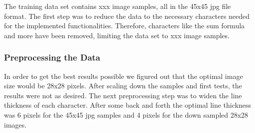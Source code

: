 \documentclass[@CLASSOPTIONS@]{tumarticle}
\begin{document}
The training data set contains xxx image samples, all in the 45x45 jpg file format.
The first step was to reduce the data to the necessary characters needed for the
implemented functionalities.
Therefore, characters like the sum formula and more have been removed, limiting the data set
to xxx image samples.

\subsubsection{Preprocessing the Data}

In order to get the best results possible we figured out that the optimal image size would be
28x28 pixels.
After scaling down the samples and first tests, the results were not as desired.
The next preprocessing step was to widen the line thickness of each character.
After some back and forth the optimal line thickness was 6 pixels for the 45x45 jpg samples and
4 pixels for the down sampled 28x28 images.
\end{document}
